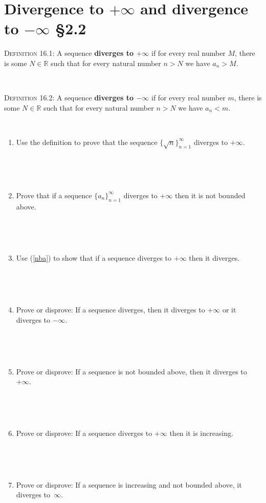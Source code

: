 \documentclass[12pt]{amsart}
\newcommand{\R}{\mathbb{R}}
\begin{document}
	
	\thispagestyle{empty}
	
	\section*{Divergence to $+\infty$ and divergence to $-\infty$ \S2.2}

	


\begin{framed}
\noindent \textsc{Definition 16.1:} A sequence \textbf{diverges to $+\infty$} if for every real number $M$, there is some $N\in \R$ such that for every natural number $n>N$ we have $a_n > M$.

\


\noindent \textsc{Definition 16.2:} A sequence \textbf{diverges to $-\infty$} if for every real number $m$, there is some $N\in \R$ such that for every natural number $n>N$ we have $a_n < m$.
\end{framed}


\


\begin{enumerate}


\item Use the definition to prove that the sequence $\{ \sqrt{n} \}_{n=1}^\infty$ diverges to $+\infty$.

\


\


\item\label{nba} Prove that if a sequence $\{ a_n\}_{n=1}^\infty$ diverges to $+\infty$ then it is not bounded above. 

\

\

\item Use (\ref{nba}) to show that if a sequence diverges to $+\infty$ then it diverges.

\

\

\item Prove or disprove: If a sequence diverges, then it diverges to $+\infty$ or it diverges to $-\infty$.

\

\


\item Prove or disprove: If a sequence is not bounded above, then it diverges to $+\infty$.

\

\

\item Prove or disprove:  If a sequence diverges to $+\infty$ then it is increasing.

\

\

\item Prove or disprove: If a sequence is increasing and not bounded above, it diverges to~$\infty$.


\end{enumerate}
\end{document}
